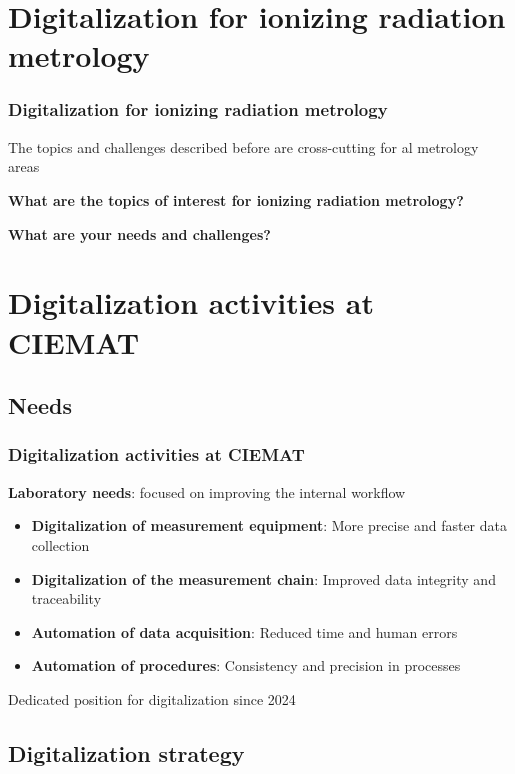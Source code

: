 \documentclass{beamer}
\begin{document}
    \section{Digitalization for ionizing radiation metrology}

    \begin{frame}
        \frametitle{Digitalization for ionizing radiation metrology}
        \centering

        The topics and challenges described before are cross-cutting for al metrology areas
        \bigskip

        \textbf{What are the topics of interest for ionizing radiation metrology?}
        \bigskip

        \textbf{What are your needs and challenges?}
    \end{frame}


    \section{Digitalization activities at CIEMAT}

    \subsection{Needs}

    \begin{frame}
        \frametitle{Digitalization activities at CIEMAT}
        \textbf{Laboratory needs}: focused on improving the internal workflow
        \begin{itemize}
            \item \textbf{Digitalization of measurement equipment}: More precise and faster data collection
            \item \textbf{Digitalization of the measurement chain}: Improved data integrity and traceability
            \item \textbf{Automation of data acquisition}: Reduced time and human errors
            \item \textbf{Automation of procedures}: Consistency and precision in processes
        \end{itemize}
        \bigskip

        Dedicated position for digitalization since 2024
    \end{frame}

    \subsection{Digitalization strategy}
\end{document}
